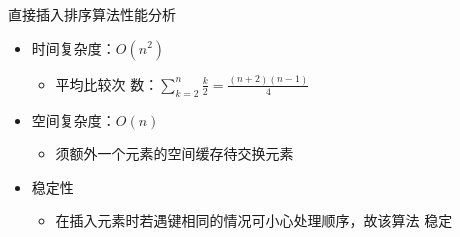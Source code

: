 \begin{frame}
    \frametitle{\insertsectionhead}
    \begin{block}{直接插入排序算法性能分析}
        \begin{itemize}
            \item 时间复杂度：$O(n^{2})$
                  \begin{itemize}
                      \item 平均比较次
                            数：$\sum_{k=2}^{n}\frac{k}{2}=\frac{(n+2)(n-1)}{4}$
                  \end{itemize}
            \item 空间复杂度：$O(n)$
                  \begin{itemize}
                      \item 须额外一个元素的空间缓存待交换元素
                  \end{itemize}
            \item 稳定性
                  \begin{itemize}
                      \item 在插入元素时若遇键相同的情况可小心处理顺序，故该算法
                            \alert{稳定}
                  \end{itemize}
        \end{itemize}
    \end{block}
\end{frame}

